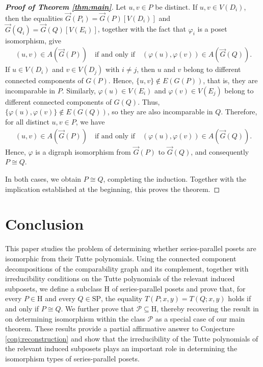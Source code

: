 \documentclass[11pt,a4paper]{article}
\begin{document}
\begin{proof}[\rm\textbf{Proof of Theorem \ref{thm:main}}]
Let $u,v\in P$ be distinct.
If $u,v\in V(D_i)$, then the equalities
$\vec G(P_i)=\vec G(P)[V(D_i)]$ and $\vec G(Q_i)=\vec G(Q)[V(E_i)]$,
together with the fact that $\varphi_i$ is a poset isomorphism, give 
\begin{eqnarray*}
(u,v)\in A(\vec G(P))\quad\text{if and only if}\quad(\varphi(u),\varphi(v))\in A(\vec G(Q)).
\end{eqnarray*}
If $u\in V(D_i)$ and $v\in V(D_j)$ with $i\neq j$,
then $u$ and $v$ belong to different connected components of $G(P)$.
Hence, $\{u,v\}\notin E(G(P))$,
that is, they are incomparable in $P$.
Similarly, $\varphi(u)\in V(E_i)$ and $\varphi(v)\in V(E_j)$
belong to different connected components of $G(Q)$.
Thus, $\{\varphi(u),\varphi(v)\}\notin E(G(Q))$,
so they are also incomparable in $Q$.
Therefore, for all distinct $u,v\in P$, we have
\begin{eqnarray*}
(u,v)\in A(\vec G(P))\quad\text{if and only if}\quad(\varphi(u),\varphi(v))\in A(\vec G(Q)).
\end{eqnarray*}
Hence, $\varphi$ is a digraph isomorphism from $\vec G(P)$ to $\vec G(Q)$,
and consequently $P\cong Q$.

In both cases, we obtain $P\cong Q$, completing the induction.
Together with the implication established at the beginning,
this proves the theorem.
\end{proof}

\section{Conclusion}

This paper studies the problem of determining whether series-parallel posets are isomorphic from their Tutte polynomials.
Using the connected component decompositions of the comparability graph and its complement,
together with irreducibility conditions on the Tutte polynomials of the relevant induced subposets,
we define a subclass $\mathrm H$ of series-parallel posets and prove that, for every $P\in\mathrm H$ and every $Q\in\mathrm{SP}$,
the equality $T(P;x,y)=T(Q;x,y)$ holds if and only if $P\cong Q$.
We further prove that $\mathcal P\subseteq\mathrm H$, thereby recovering the result in \cite{Gordon1996}
on determining isomorphism within the class $\mathcal P$ as a special case of our main theorem.
These results provide a partial affirmative answer to Conjecture \ref{conj:reconstruction}
and show that the irreducibility of the Tutte polynomials of the relevant induced subposets plays an important role
in determining the isomorphism types of series-parallel posets.
\end{document}
